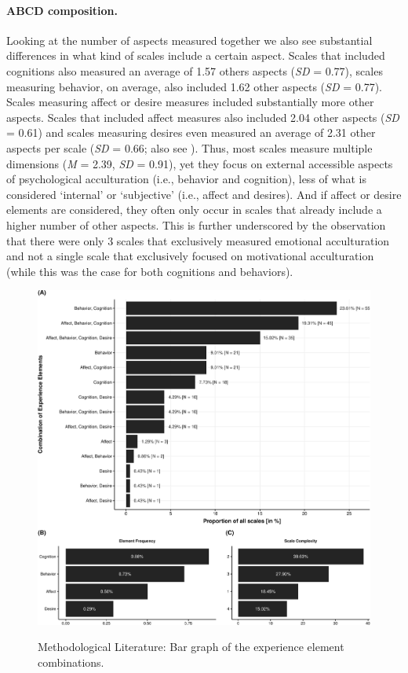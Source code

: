 \paragraph{ABCD composition.}

Looking at the number of aspects measured together we also see
substantial differences in what kind of scales include a certain aspect.
Scales that included cognitions also measured an average of 1.57 others
aspects (\textit{SD} = 0.77), scales measuring behavior, on average,
also included 1.62 other aspects (\textit{SD} = 0.77). Scales measuring
affect or desire measures included substantially more other aspects.
Scales that included affect measures also included 2.04 other aspects
(\textit{SD} = 0.61) and scales measuring desires even measured an
average of 2.31 other aspects per scale (\textit{SD} = 0.66; also see
). Thus, most scales measure multiple
dimensions (\textit{M} = 2.39, \textit{SD} = 0.91), yet they focus on
external accessible aspects of psychological acculturation (i.e.,
behavior and cognition), less of what is considered `internal' or
`subjective' (i.e., affect and desires). And if affect or desire
elements are considered, they often only occur in scales that already
include a higher number of other aspects. This is further underscored by
the observation that there were only 3 scales that exclusively measured
emotional acculturation and not a single scale that exclusively focused
on motivational acculturation (while this was the case for both
cognitions and behaviors).

\begin{figure}[h]
\centering
\caption{Methodological Literature: Bar graph of the experience element combinations.}
\includegraphics[width=\textwidth]{Figures/ABCDFreq-1}
\label{fig:ElementsScales}
\end{figure}

